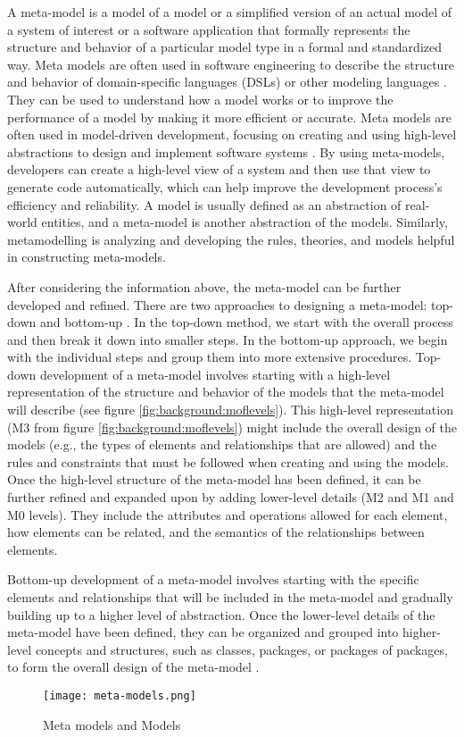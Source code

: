 A meta-model is a model of a model or a simplified version of an actual model of a system of interest or a software application that formally represents the structure and behavior of a particular model type in a formal and standardized way.
Meta models are often used in software engineering to describe the structure and behavior of domain-specific languages (DSLs) or other modeling languages \cite{misc:metamodels:dsl}.
They can be used to understand how a model works or to improve the performance of a model by making it more efficient or accurate. 
Meta models are often used in model-driven development, focusing on creating and using high-level abstractions to design and implement software systems \cite{misc:metamodels:mdd}. 
By using meta-models, developers can create a high-level view of a system and then use that view to generate code automatically, which can help improve the development process's efficiency and reliability.
A model is usually defined as an abstraction of real-world entities, and a meta-model is another abstraction of the models. 
Similarly, metamodelling is analyzing and developing the rules, theories, and models helpful in constructing meta-models.

After considering the information above, the meta-model can be further developed and refined. 
There are two approaches to designing a meta-model: top-down and bottom-up \cite{misc:mbse:mof}. 
In the top-down method, we start with the overall process and then break it down into smaller steps. 
In the bottom-up approach, we begin with the individual steps and group them into more extensive procedures.
Top-down development of a meta-model involves starting with a high-level representation of the structure and behavior of the models that the meta-model will describe (see figure \ref{fig:background:moflevels}). 
This high-level representation (M3 from figure \ref{fig:background:moflevels}) might include the overall design of the models (e.g., the types of elements and relationships that are allowed) and the rules and constraints that must be followed when creating and using the models.
Once the high-level structure of the meta-model has been defined, it can be further refined and expanded upon by adding lower-level details (M2 and M1 and M0 levels). 
They include the attributes and operations allowed for each element, how elements can be related, and the semantics of the relationships between elements.

Bottom-up development of a meta-model involves starting with the specific elements and relationships that will be included in the meta-model and gradually building up to a higher level of abstraction. 
Once the lower-level details of the meta-model have been defined, they can be organized and grouped into higher-level concepts and structures, such as classes, packages, or packages of packages, to form the overall design of the meta-model \cite{misc:mbse:mof}.
\begin{figure}[htbp!]
  \centering    
  \texttt{[image: meta-models.png]}
  \caption[Meta models]{Meta models and Models}
  \label{fig:background:m1m2}
\end{figure}

